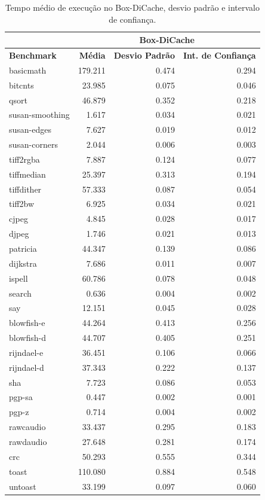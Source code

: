 \documentclass[11pt,twoside]{article}
\begin{document}
\begin{table}
 \caption{Tempo médio de execução no Box-DiCache, desvio padrão e intervalo de confiança.}
 \begin{center}
 \begin{tabular}{|l|r|r|r|}
   \cline{2-4}
   \multicolumn{1}{c|}{}& \multicolumn{3}{|c|}{Box-DiCache} \\ \hline
   \bf{Benchmark} & \bf{Média} & \bf{Desvio Padrão} & \bf{Int. de Confiança} \\ \hline
   basicmath & 179.211 & 0.474 & 0.294\\ \hline 
   bitcnts & 23.985 & 0.075 & 0.046\\ \hline 
   qsort & 46.879 & 0.352 & 0.218\\ \hline 
   susan-smoothing & 1.617 & 0.034 & 0.021\\ \hline 
   susan-edges & 7.627 & 0.019 & 0.012\\ \hline 
   susan-corners & 2.044 & 0.006 & 0.003\\ \hline 
   tiff2rgba & 7.887 & 0.124 & 0.077\\ \hline 
   tiffmedian & 25.397 & 0.313 & 0.194\\ \hline 
   tiffdither & 57.333 & 0.087 & 0.054\\ \hline 
   tiff2bw & 6.925 & 0.034 & 0.021\\ \hline 
   cjpeg & 4.845 & 0.028 & 0.017\\ \hline 
   djpeg & 1.746 & 0.021 & 0.013\\ \hline 
   patricia & 44.347 & 0.139 & 0.086\\ \hline 
   dijkstra & 7.686 & 0.011 & 0.007\\ \hline 
   ispell & 60.786 & 0.078 & 0.048\\ \hline 
   search & 0.636 & 0.004 & 0.002\\ \hline 
   say & 12.151 & 0.045 & 0.028\\ \hline 
   blowfish-e & 44.264 & 0.413 & 0.256\\ \hline 
   blowfish-d & 44.707 & 0.405 & 0.251\\ \hline 
   rijndael-e & 36.451 & 0.106 & 0.066\\ \hline 
   rijndael-d & 37.343 & 0.222 & 0.137\\ \hline 
   sha & 7.723 & 0.086 & 0.053\\ \hline 
   pgp-sa & 0.447 & 0.002 & 0.001\\ \hline 
   pgp-z & 0.714 & 0.004 & 0.002\\ \hline 
   rawcaudio & 33.437 & 0.295 & 0.183\\ \hline 
   rawdaudio & 27.648 & 0.281 & 0.174\\ \hline 
   crc & 50.293 & 0.555 & 0.344\\ \hline 
   toast & 110.080 & 0.884 & 0.548\\ \hline 
   untoast & 33.199 & 0.097 & 0.060\\
   \hline
  \end{tabular}
  \label{tab:tempos_boxdicache}
 \end{center}
\end{table}
\end{document}
